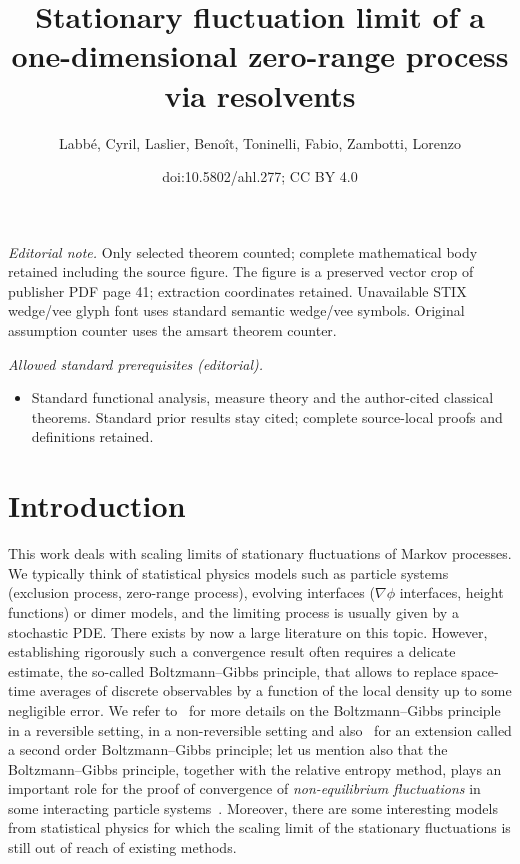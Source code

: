 \documentclass[10pt]{amsart}
\title{Stationary fluctuation limit of a one-dimensional zero-range process via resolvents}
\author{Labbé, Cyril, Laslier, Benoît, Toninelli, Fabio, Zambotti, Lorenzo}
\date{doi:10.5802/ahl.277; CC BY 4.0}
\theoremstyle{definition}\newtheorem{defi}[theo]{Definition}\newtheorem{rema}[theo]{Remark}\newtheorem{exam}[theo]{Example}\newtheorem{exem}[theo]{Example}\newtheorem{nota}[theo]{Notation}
\theoremstyle{plain}
\begin{document}
\maketitle
\noindent\textit{Editorial note.} Only selected theorem counted; complete mathematical body retained including the source figure. The figure is a preserved vector crop of publisher PDF page 41; extraction coordinates retained. Unavailable STIX wedge/vee glyph font uses standard semantic wedge/vee symbols. Original assumption counter uses the amsart theorem counter.\par\medskip
\noindent\textit{Allowed standard prerequisites (editorial).}\begin{itemize}
\item Standard functional analysis, measure theory and the author-cited classical theorems. Standard prior results stay cited; complete source-local proofs and definitions retained.
\end{itemize}\medskip



\setcounter{tocdepth}{1}
\tableofcontents

\section{Introduction}

This work deals with scaling limits of stationary fluctuations of Markov processes. We typically think of statistical physics models such as particle systems (exclusion process, zero-range process), evolving interfaces ($\nabla \phi$ interfaces, height functions) or dimer models, and the limiting process is usually given by a stochastic PDE. There exists by now a large literature on this topic. However, establishing rigorously such a convergence result often requires a delicate estimate, the so-called Boltzmann--Gibbs principle, that allows to replace space-time averages of discrete observables by a function of the local density up to some negligible error. We refer to~\cite[Section~11.1]{KipLan} for more details on the Boltzmann--Gibbs principle in a reversible setting, \cite{ChangLandimOlla} in a non-reversible setting and also~\cite{GoncalvesJara} for an extension called a second order Boltzmann--Gibbs principle; let us mention also that the Boltzmann--Gibbs principle, together with the relative entropy method, plays an important role for the proof of convergence of \emph{non-equilibrium fluctuations} in some interacting particle systems~\cite{JM}. Moreover, there are some interesting models from statistical physics for which the scaling limit of the stationary fluctuations is still out of reach of existing methods.
\end{document}

